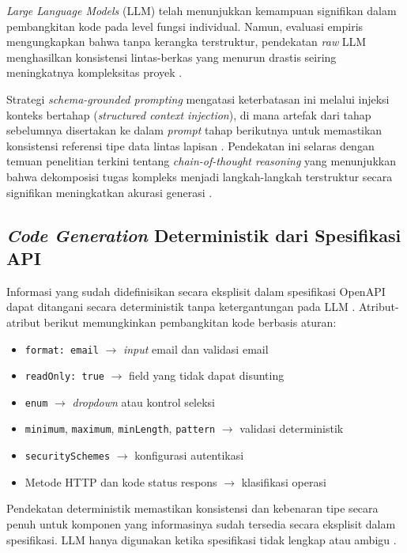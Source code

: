 \textit{Large Language Models} (LLM) telah menunjukkan kemampuan signifikan dalam pembangkitan kode pada level fungsi individual. Namun, evaluasi empiris mengungkapkan bahwa tanpa kerangka terstruktur, pendekatan \textit{raw} LLM menghasilkan konsistensi lintas-berkas yang menurun drastis seiring meningkatnya kompleksitas proyek \cite{ying2025}.

Strategi \textit{schema-grounded prompting} mengatasi keterbatasan ini melalui injeksi konteks bertahap (\textit{structured context injection}), di mana artefak dari tahap sebelumnya disertakan ke dalam \textit{prompt} tahap berikutnya untuk memastikan konsistensi referensi tipe data lintas lapisan \cite{lee2021}. Pendekatan ini selaras dengan temuan penelitian terkini tentang \textit{chain-of-thought reasoning} yang menunjukkan bahwa dekomposisi tugas kompleks menjadi langkah-langkah terstruktur secara signifikan meningkatkan akurasi generasi \cite{besta2025}.

\subsection{\textit{Code Generation} Deterministik dari Spesifikasi API}

Informasi yang sudah didefinisikan secara eksplisit dalam spesifikasi OpenAPI dapat ditangani secara deterministik tanpa ketergantungan pada LLM \cite{openapi2021}. Atribut-atribut berikut memungkinkan pembangkitan kode berbasis aturan:

\begin{itemize}
    \item \texttt{format: email} $\rightarrow$ \textit{input} email dan validasi email
    \item \texttt{readOnly: true} $\rightarrow$ field yang tidak dapat disunting
    \item \texttt{enum} $\rightarrow$ \textit{dropdown} atau kontrol seleksi
    \item \texttt{minimum}, \texttt{maximum}, \texttt{minLength}, \texttt{pattern} $\rightarrow$ validasi deterministik
    \item \texttt{securitySchemes} $\rightarrow$ konfigurasi autentikasi
    \item Metode HTTP dan kode status respons $\rightarrow$ klasifikasi operasi
\end{itemize}

Pendekatan deterministik memastikan konsistensi dan kebenaran tipe secara penuh untuk komponen yang informasinya sudah tersedia secara eksplisit dalam spesifikasi. LLM hanya digunakan ketika spesifikasi tidak lengkap atau ambigu \cite{khalfaoui2025}.

